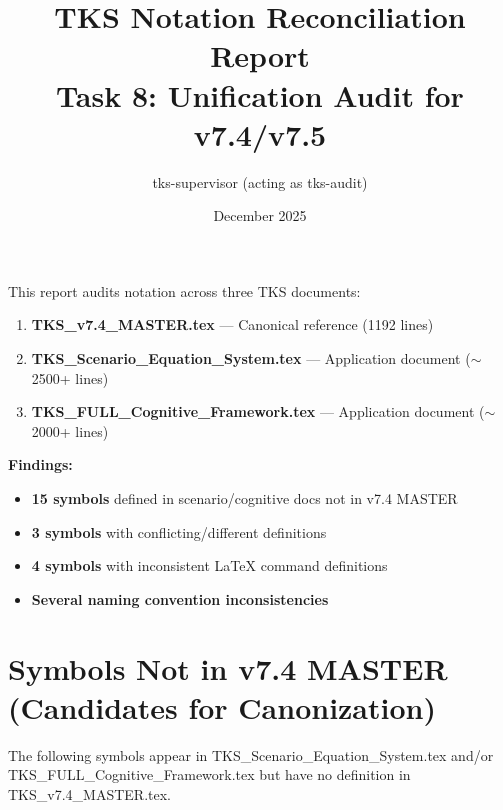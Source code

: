 \documentclass[11pt]{article}
\title{\textbf{TKS Notation Reconciliation Report}\\[0.5em]
\large Task 8: Unification Audit for v7.4/v7.5}
\author{tks-supervisor (acting as tks-audit)}
\date{December 2025}
\begin{document}
\maketitle

\begin{tcolorbox}[colback=blue!5!white,colframe=blue!75!black,title=\textbf{Executive Summary}]
This report audits notation across three TKS documents:
\begin{enumerate}
    \item \textbf{TKS\_v7.4\_MASTER.tex} --- Canonical reference (1192 lines)
    \item \textbf{TKS\_Scenario\_Equation\_System.tex} --- Application document ($\sim$2500+ lines)
    \item \textbf{TKS\_FULL\_Cognitive\_Framework.tex} --- Application document ($\sim$2000+ lines)
\end{enumerate}

\textbf{Findings:}
\begin{itemize}
    \item \textbf{15 symbols} defined in scenario/cognitive docs not in v7.4 MASTER
    \item \textbf{3 symbols} with conflicting/different definitions
    \item \textbf{4 symbols} with inconsistent LaTeX command definitions
    \item \textbf{Several naming convention inconsistencies}
\end{itemize}
\end{tcolorbox}

\tableofcontents
\newpage

\section{Symbols Not in v7.4 MASTER (Candidates for Canonization)}

The following symbols appear in TKS\_Scenario\_Equation\_System.tex and/or TKS\_FULL\_Cognitive\_Framework.tex but have no definition in TKS\_v7.4\_MASTER.tex.
\end{document}
